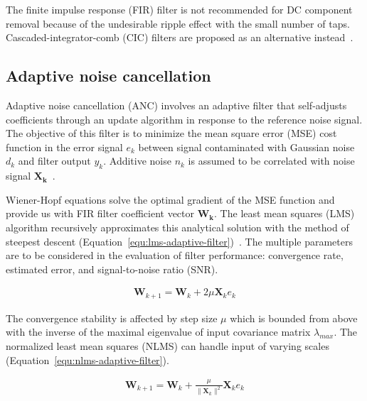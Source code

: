 The finite impulse response (FIR) filter is not recommended for DC component removal because of the undesirable ripple effect with the small number of taps. Cascaded-integrator-comb (CIC) filters are proposed as an alternative instead~\cite{lyons_understanding_2011}.

\subsection{Adaptive noise cancellation}
Adaptive noise cancellation (ANC) involves an adaptive filter that self-adjusts coefficients through an update algorithm in response to the reference noise signal.  The objective of this filter is to minimize the mean square error (MSE) cost function in the error signal $e_k$ between signal contaminated with Gaussian noise $d_k$ and filter output $y_k$. Additive noise $n_k$ is assumed to be correlated with noise signal $\mathbf{X_k}$~\cite{diniz_adaptive_2020}.

Wiener-Hopf equations solve the optimal gradient of the MSE function and provide us with FIR filter coefficient vector $\mathbf{W_k}$.  The least mean squares (LMS) algorithm recursively approximates this analytical solution with the method of steepest descent (Equation~\ref{equ:lms-adaptive-filter})~\cite{diniz_adaptive_2020}. The multiple parameters are to be considered in the evaluation of filter performance: convergence rate, estimated error, and signal-to-noise ratio (SNR).

\begin{ceqn}\begin{align} \label{equ:lms-adaptive-filter}
\mathbf{W}_{k+1} = \mathbf{W}_{k} + 2 \mu \mathbf{X}_{k}  e_k
\end{align}\end{ceqn}

The convergence stability is affected by step size $\mu$ which is bounded from above with the inverse of the maximal eigenvalue of input covariance matrix $\lambda_{max}$. The normalized least mean squares (NLMS) can handle input of varying scales  (Equation~\ref{equ:nlms-adaptive-filter}).

\begin{ceqn}\begin{align} \label{equ:nlms-adaptive-filter}
\mathbf{W}_{k+1} = \mathbf{W}_{k} + \frac{\mu}{\lVert\mathbf{X}_{k}\rVert^2} \mathbf{X}_{k}  e_k
\end{align}\end{ceqn}

